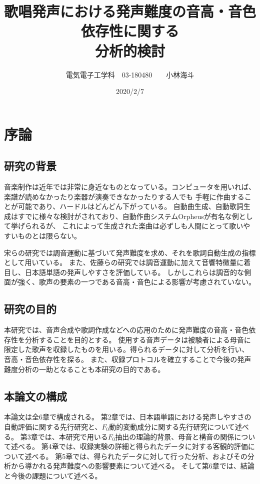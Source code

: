\documentclass[10.5ptj,a4j,dvipdfmx,uplatex, oneside, openany, report]{jsbook}%
\title{歌唱発声における発声難度の音高・音色依存性に関する\\分析的検討}
\author{電気電子工学科　03-180480　　小林海斗}
\date{2020/2/7}
\begin{document}
\maketitle

\tableofcontents

\chapter{序論}

\section{研究の背景}
音楽制作は近年では非常に身近なものとなっている。コンピュータを用いれば、楽譜が読めなかったり楽器が演奏できなかったりする人でも
手軽に作曲することが可能であり、ハードルはどんどん下がっている。
自動曲生成、自動歌詞生成はすでに様々な検討がされており、自動作曲システムOrpheus\cite{orpheus}が有名な例として挙げられるが、
これによって生成された楽曲は必ずしも人間にとって歌いやすいものとは限らない。

宋らの研究では調音運動に基づいて発声難度を求め、それを歌詞自動生成の指標として用いている\cite{so}。
また、佐藤らの研究では調音運動に加えて音響特徴量に着目し、日本語単語の発声しやすさを評価している\cite{sato}。
しかしこれらは調音的な側面が強く、歌声の要素の一つである音高・音色による影響が考慮されていない。


\section{研究の目的}
本研究では、音声合成や歌詞作成などへの応用のために発声難度の音高・音色依存性を分析することを目的とする。
使用する音声データは被験者による母音に限定した歌声を収録したものを用いる。得られるデータに対して分析を行い、
音高・音色依存性を探る。
また、収録プロトコルを確立することで今後の発声難度分析の一助となることも本研究の目的である。

\section{本論文の構成}
本論文は全6章で構成される。
第2章では、日本語単語における発声しやすさの自動評価に関する先行研究と、$F_0$動的変動成分に関する先行研究について述べる。
第3章では、本研究で用いる$F_0$抽出の理論的背景、母音と構音の関係について述べる。
第4章では、収録実験の詳細と得られたデータに対する客観的評価について述べる。
第5章では、得られたデータに対して行った分析、およびその分析から導かれる発声難度への影響要素について述べる。
そして第6章では、結論と今後の課題について述べる。
\end{document}
